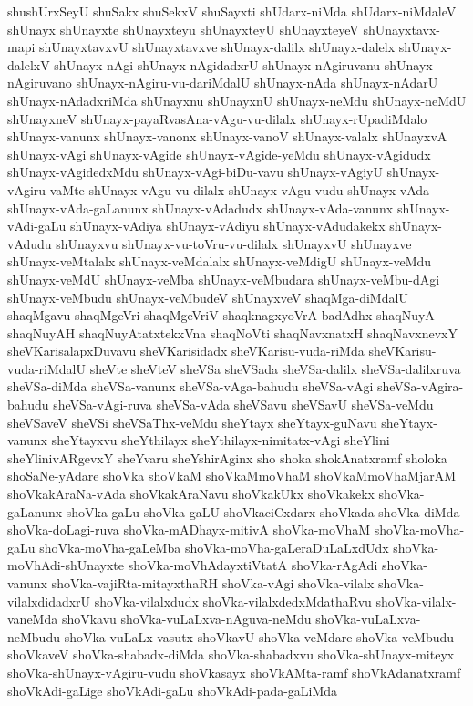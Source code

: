 {shushUrxSeyU
shuSakx
shuSekxV
shuSayxti
shUdarx-niMda
shUdarx-niMdaleV
shUnayx
shUnayxte
shUnayxteyu
shUnayxteyU
shUnayxteyeV
shUnayxtavx-mapi
shUnayxtavxvU
shUnayxtavxve
shUnayx-dalilx
shUnayx-dalelx
shUnayx-dalelxV
shUnayx-nAgi
shUnayx-nAgidadxrU
shUnayx-nAgiruvanu
shUnayx-nAgiruvano
shUnayx-nAgiru-vu-dariMdalU
shUnayx-nAda
shUnayx-nAdarU
shUnayx-nAdadxriMda
shUnayxnu
shUnayxnU
shUnayx-neMdu
shUnayx-neMdU
shUnayxneV
shUnayx-payaRvasAna-vAgu-vu-dilalx
shUnayx-rUpadiMdalo
shUnayx-vanunx
shUnayx-vanonx
shUnayx-vanoV
shUnayx-valalx
shUnayxvA
shUnayx-vAgi
shUnayx-vAgide
shUnayx-vAgide-yeMdu
shUnayx-vAgidudx
shUnayx-vAgidedxMdu
shUnayx-vAgi-biDu-vavu
shUnayx-vAgiyU
shUnayx-vAgiru-vaMte
shUnayx-vAgu-vu-dilalx
shUnayx-vAgu-vudu
shUnayx-vAda
shUnayx-vAda-gaLanunx
shUnayx-vAdadudx
shUnayx-vAda-vanunx
shUnayx-vAdi-gaLu
shUnayx-vAdiya
shUnayx-vAdiyu
shUnayx-vAdudakekx
shUnayx-vAdudu
shUnayxvu
shUnayx-vu-toVru-vu-dilalx
shUnayxvU
shUnayxve
shUnayx-veMtalalx
shUnayx-veMdalalx
shUnayx-veMdigU
shUnayx-veMdu
shUnayx-veMdU
shUnayx-veMba
shUnayx-veMbudara
shUnayx-veMbu-dAgi
shUnayx-veMbudu
shUnayx-veMbudeV
shUnayxveV
shaqMga-diMdalU
shaqMgavu
shaqMgeVri
shaqMgeVriV
shaqknagxyoVrA-badAdhx
shaqNuyA
shaqNuyAH
shaqNuyAtatxtekxVna
shaqNoVti
shaqNavxnatxH
shaqNavxnevxY
sheVKarisalapxDuvavu
sheVKarisidadx
sheVKarisu-vuda-riMda
sheVKarisu-vuda-riMdalU
sheVte
sheVteV
sheVSa
sheVSada
sheVSa-dalilx
sheVSa-dalilxruva
sheVSa-diMda
sheVSa-vanunx
sheVSa-vAga-bahudu
sheVSa-vAgi
sheVSa-vAgira-bahudu
sheVSa-vAgi-ruva
sheVSa-vAda
sheVSavu
sheVSavU
sheVSa-veMdu
sheVSaveV
sheVSi
sheVSaThx-veMdu
sheYtayx
sheYtayx-guNavu
sheYtayx-vanunx
sheYtayxvu
sheYthilayx
sheYthilayx-nimitatx-vAgi
sheYlini
sheYlinivARgevxY
sheYvaru
sheYshirAginx
sho
shoka
shokAnatxramf
sholoka
shoSaNe-yAdare
shoVka
shoVkaM
shoVkaMmoVhaM
shoVkaMmoVhaMjarAM
shoVkakAraNa-vAda
shoVkakAraNavu
shoVkakUkx
shoVkakekx
shoVka-gaLanunx
shoVka-gaLu
shoVka-gaLU
shoVkaciCxdarx
shoVkada
shoVka-diMda
shoVka-doLagi-ruva
shoVka-mADhayx-mitivA
shoVka-moVhaM
shoVka-moVha-gaLu
shoVka-moVha-gaLeMba
shoVka-moVha-gaLeraDuLaLxdUdx
shoVka-moVhAdi-shUnayxte
shoVka-moVhAdayxtiVtatA
shoVka-rAgAdi
shoVka-vanunx
shoVka-vajiRta-mitayxthaRH
shoVka-vAgi
shoVka-vilalx
shoVka-vilalxdidadxrU
shoVka-vilalxdudx
shoVka-vilalxdedxMdathaRvu
shoVka-vilalx-vaneMda
shoVkavu
shoVka-vuLaLxva-nAguva-neMdu
shoVka-vuLaLxva-neMbudu
shoVka-vuLaLx-vasutx
shoVkavU
shoVka-veMdare
shoVka-veMbudu
shoVkaveV
shoVka-shabadx-diMda
shoVka-shabadxvu
shoVka-shUnayx-miteyx
shoVka-shUnayx-vAgiru-vudu
shoVkasayx
shoVkAMta-ramf
shoVkAdanatxramf
shoVkAdi-gaLige
shoVkAdi-gaLu
shoVkAdi-pada-gaLiMda
}
